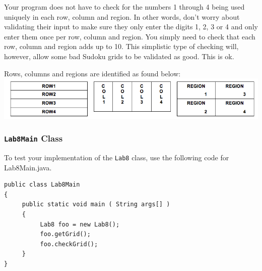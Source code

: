\noindent Your program does not have to check for the numbers 1 through 4 being used uniquely in each row, column and region.  In other words, don't worry about validating their input to make sure they only enter the digits 1, 2, 3 or 4 and only enter them once per row, column and region.  
You simply need to check that each row, column and region adds up to 10. This simplistic type of checking will, however, allow some bad Sudoku grids to be validated as good. This is ok. 

\noindent Rows, columns and regions are identified as found below:\\
\includegraphics[scale=0.5]{sud}

\subsubsection*{{\tt Lab8Main} Class}

To test your implementation of the {\tt Lab8} class, use the following code for Lab8Main.java.
\begin{verbatim}
public class Lab8Main
{
     public static void main ( String args[] )
     {
          Lab8 foo = new Lab8();
          foo.getGrid();
          foo.checkGrid();
     }
}
\end{verbatim}

